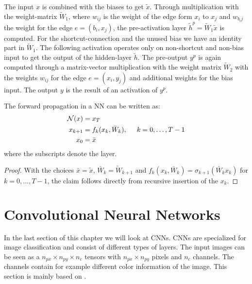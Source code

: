 \documentclass[a4paper, 12pt]{scrreprt} %
\begin{document}
\begin{myExample}
The input $x$ is combined with the biases to get $\tilde{x}$. Through multiplication with the weight-matrix $\tilde{W}_1$, where $w_{i j}$ is the weight of the edge form $x_i$ to $x_j$ and $w_{b_i j}$ the weight for the edge $e = (b_i, x_j)$, the pre-activation layer $\tilde{h}^p = \tilde{W}_1 \tilde{x}$ is computed. For the shortcut-connection and the unused bias we have an identity part in $\tilde{W}_1$. The following activation operates only on non-shortcut and non-bias input to get the output of the hidden-layer $\tilde{h}$.\newline
The pre-output $y^p$ is again computed through a matrix-vector multiplication with the weight matrix $\tilde{W}_2$ with the weights $w_{i j}$ for the edge $e=(x_i,y_j)$ and additional weights for the bias input. The output $y$ is the result of an activation of $y^p$.



\end{myExample} 

\begin{myLemma}
\label{lem:fwp}
The forward propagation in a \ac{NN} can be written as:
\begin{align*}
\mathcal{N}(x) &= x_T \\
x_{k+1} &= f_{k}(x_{k},\bar{W}_{k}) , \hspace{0.5cm}k = 0, \dots, T-1 \\
x_0 &= \bar{x} 
\end{align*}
where the subscripts denote the layer.
\end{myLemma}
\begin{proof}
With the choices $\bar{x} = \tilde{x}$, $\bar{W}_k = \tilde{W}_{k+1}$ and $f_k(x_k,\bar{W}_k)=\sigma_{k+1}(\bar{W}_k x_k)$ for $k=0, \dots, T-1$, the claim follows directly from recursive insertion of the $x_k$.
\end{proof}


\section{Convolutional Neural Networks}
\label{sec:CNN}
In the last section of this chapter we will look at \acp{CNN}. \acp{CNN} are specialized for image classification and consist of different types of layers. The input images can be seen as a $n_{px} \times n_{py} \times n_c$ tensors with $n_{px} \times n_{py}$ pixels and $n_c$ channels. The channels contain for example different color information of the image. This section is mainly based on \cite{cs231n}.
\end{document}

